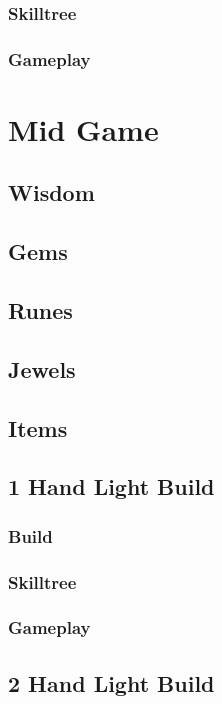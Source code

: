 \documentclass[12pt]{article}
\begin{document}
\subsubsection{Skilltree}
\subsubsection{Gameplay}



\newpage


\section{Mid Game}
\subsection{Wisdom}
\subsection{Gems}
\subsection{Runes}
\subsection{Jewels}
\subsection{Items}
\subsection{1 Hand Light Build}
\subsubsection{Build}
\subsubsection{Skilltree}
\subsubsection{Gameplay}
\subsection{2 Hand Light Build}
\end{document}
